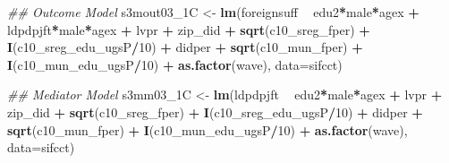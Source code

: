 \documentclass[
]{article}
\newenvironment{Shaded}{\begin{snugshade}}{\end{snugshade}}
\newcommand{\CommentTok}[1]{\textcolor[rgb]{0.56,0.35,0.01}{\textit{#1}}}
\newcommand{\DataTypeTok}[1]{\textcolor[rgb]{0.13,0.29,0.53}{#1}}
\newcommand{\DecValTok}[1]{\textcolor[rgb]{0.00,0.00,0.81}{#1}}
\newcommand{\KeywordTok}[1]{\textcolor[rgb]{0.13,0.29,0.53}{\textbf{#1}}}
\newcommand{\NormalTok}[1]{#1}
\newcommand{\OperatorTok}[1]{\textcolor[rgb]{0.81,0.36,0.00}{\textbf{#1}}}
\newcommand{\StringTok}[1]{\textcolor[rgb]{0.31,0.60,0.02}{#1}}
\begin{document}
\begin{Shaded}
\begin{Highlighting}[]
\CommentTok{## Outcome Model }
\NormalTok{s3mout03_1C <-}\StringTok{ }\KeywordTok{lm}\NormalTok{(foreignsuff  }\OperatorTok{~}\StringTok{ }\NormalTok{edu2}\OperatorTok{*}\NormalTok{male}\OperatorTok{*}\NormalTok{agex }\OperatorTok{+}\StringTok{ }\NormalTok{ldpdpjft}\OperatorTok{*}\NormalTok{male}\OperatorTok{*}\NormalTok{agex }\OperatorTok{+}\StringTok{ }\NormalTok{lvpr }\OperatorTok{+}\StringTok{  }
\StringTok{                    }\NormalTok{zip_did }\OperatorTok{+}\StringTok{ }\KeywordTok{sqrt}\NormalTok{(c10_sreg_fper) }\OperatorTok{+}\StringTok{ }\KeywordTok{I}\NormalTok{(c10_sreg_edu_ugsP}\OperatorTok{/}\DecValTok{10}\NormalTok{) }\OperatorTok{+}\StringTok{ }
\StringTok{                    }\NormalTok{didper }\OperatorTok{+}\StringTok{ }\KeywordTok{sqrt}\NormalTok{(c10_mun_fper) }\OperatorTok{+}\StringTok{ }\KeywordTok{I}\NormalTok{(c10_mun_edu_ugsP}\OperatorTok{/}\DecValTok{10}\NormalTok{) }\OperatorTok{+}\StringTok{ }
\StringTok{                    }\KeywordTok{as.factor}\NormalTok{(wave), }\DataTypeTok{data=}\NormalTok{sifcct)}

\CommentTok{## Mediator Model}
\NormalTok{s3mm03_1C <-}\StringTok{ }\KeywordTok{lm}\NormalTok{(ldpdpjft }\OperatorTok{~}\StringTok{ }\NormalTok{edu2}\OperatorTok{*}\NormalTok{male}\OperatorTok{*}\NormalTok{agex }\OperatorTok{+}\StringTok{ }\NormalTok{lvpr }\OperatorTok{+}\StringTok{  }
\StringTok{                  }\NormalTok{zip_did }\OperatorTok{+}\StringTok{ }\KeywordTok{sqrt}\NormalTok{(c10_sreg_fper) }\OperatorTok{+}\StringTok{ }\KeywordTok{I}\NormalTok{(c10_sreg_edu_ugsP}\OperatorTok{/}\DecValTok{10}\NormalTok{) }\OperatorTok{+}\StringTok{ }
\StringTok{                  }\NormalTok{didper }\OperatorTok{+}\StringTok{ }\KeywordTok{sqrt}\NormalTok{(c10_mun_fper) }\OperatorTok{+}\StringTok{ }\KeywordTok{I}\NormalTok{(c10_mun_edu_ugsP}\OperatorTok{/}\DecValTok{10}\NormalTok{) }\OperatorTok{+}\StringTok{ }
\StringTok{                  }\KeywordTok{as.factor}\NormalTok{(wave), }\DataTypeTok{data=}\NormalTok{sifcct)}


\end{Highlighting}
\end{Shaded}
\end{document}
